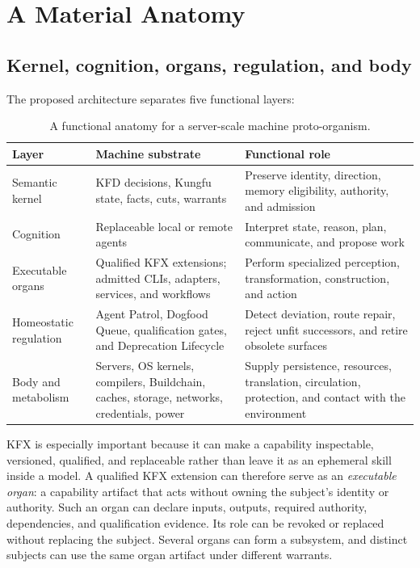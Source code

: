 \section{A Material Anatomy}

\subsection{Kernel, cognition, organs, regulation, and body}

The proposed architecture separates five functional layers:

\begin{table}[ht]
\centering
\small
\begin{tabularx}{\textwidth}{@{}p{}p{}X@{}}
\toprule
\rowcolor{MLIndigo}
\textcolor{MLWhite}{\textbf{Layer}} &
\textcolor{MLWhite}{\textbf{Machine substrate}} &
\textcolor{MLWhite}{\textbf{Functional role}} \\
\midrule
\rowcolor{MLPanel}
Semantic kernel & KFD decisions, Kungfu state, facts, cuts, warrants &
Preserve identity, direction, memory eligibility, authority, and admission \\
\rowcolor{MLPaperSoft}
Cognition & Replaceable local or remote agents &
Interpret state, reason, plan, communicate, and propose work \\
\rowcolor{MLPanel}
Executable organs & Qualified KFX extensions; admitted CLIs, adapters,
services, and workflows &
Perform specialized perception, transformation, construction, and action \\
\rowcolor{MLPaperSoft}
Homeostatic regulation & Agent Patrol, Dogfood Queue, qualification gates,
and Deprecation Lifecycle &
Detect deviation, route repair, reject unfit successors, and retire obsolete
surfaces \\
\rowcolor{MLPanel}
Body and metabolism & Servers, OS kernels, compilers, Buildchain, caches,
storage, networks, credentials, power &
Supply persistence, resources, translation, circulation, protection, and
contact with the environment \\
\bottomrule
\end{tabularx}
\caption{A functional anatomy for a server-scale machine proto-organism.}
\label{tab:anatomy}
\end{table}

KFX is especially important because it can make a capability inspectable,
versioned, qualified, and replaceable rather than leave it as an ephemeral
skill inside a model. A qualified KFX extension can therefore serve as an
\emph{executable organ}: a capability artifact that acts without owning the
subject's identity or authority. Such an organ can declare inputs, outputs,
required authority, dependencies, and qualification evidence. Its role can be
revoked or replaced without replacing the subject. Several organs can form a
subsystem, and distinct subjects can use the same organ artifact under
different warrants.

